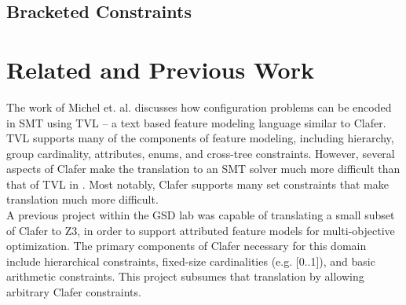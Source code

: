 \documentclass{article}
\begin{document}
\subsection{Bracketed Constraints}

\section{Related and Previous Work}
The work of Michel et. al. \cite{Michel2012} discusses how configuration problems can be encoded in SMT using TVL \cite{Classen2011} -- a text based feature modeling language similar to Clafer. TVL supports many of the components of feature modeling, including hierarchy, group cardinality, attributes, enums, and cross-tree constraints. However, several aspects of Clafer make the translation to an SMT solver much more difficult than that of TVL in \cite{Michel2012}. Most notably, Clafer supports many set constraints that make translation much more difficult. \\
\indent  A previous project \cite{Olaechea2013} within the GSD lab was capable of translating a small subset of Clafer to Z3, in order to support attributed feature models for multi-objective optimization. The primary components of Clafer necessary for this domain include hierarchical constraints, fixed-size cardinalities (e.g. [0..1]), and basic arithmetic constraints. This project subsumes that translation by allowing arbitrary Clafer constraints.
\end{document}
